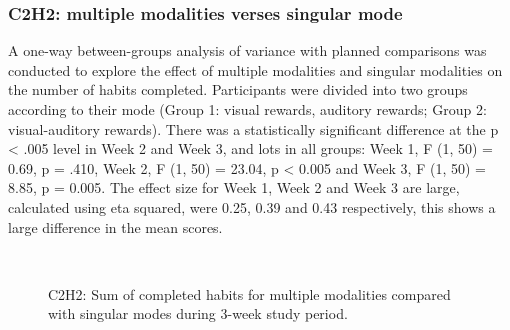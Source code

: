 \documentclass{scaffold/sigchi}
\begin{document}
\subsubsection{C2H2: multiple modalities verses singular mode}

A one-way between-groups analysis of variance with planned comparisons was conducted to explore the effect of multiple modalities and singular modalities on the number of habits completed. Participants were divided into two groups according to their mode (Group 1: visual rewards, auditory rewards; Group 2: visual-auditory rewards). There was a statistically significant difference at the p < .005 level in Week 2 and Week 3, and lots in all groups: Week 1, F (1, 50) = 0.69, p = .410, Week 2, F (1, 50) = 23.04, p < 0.005 and Week 3, F (1, 50) = 8.85, p = 0.005. The effect size for Week 1, Week 2 and Week 3 are large, calculated using eta squared, were 0.25, 0.39 and 0.43 respectively, this shows a large difference in the mean scores.

\begin{figure}
  \centering
  \caption{C2H2: Sum of completed habits for multiple modalities compared with singular modes during 3-week study period.}~\label{fig:c2_h2}
\end{figure}
\end{document}
